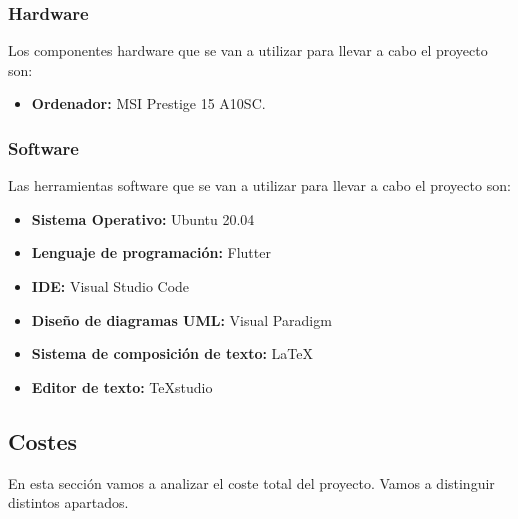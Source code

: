 \begin{adjustwidth}{2em}{0pt} %
\subsubsection{Hardware}

Los componentes hardware que se van a utilizar para llevar a cabo el proyecto son: 

\begin{itemize}
	\item \textbf{Ordenador:} MSI Prestige 15 A10SC.
\end{itemize}

\subsubsection{Software}

Las herramientas software que se van a utilizar para llevar a cabo el proyecto son: 

\begin{itemize}
	\item \textbf{Sistema Operativo:} Ubuntu 20.04
	\item \textbf{Lenguaje de programación:} Flutter
	\item \textbf{IDE:} Visual Studio Code
	\item \textbf{Diseño de diagramas UML:} Visual Paradigm
	\item \textbf{Sistema de composición de texto:} LaTeX
	\item \textbf{Editor de texto:} TeXstudio
\end{itemize}
\end{adjustwidth} 

\subsection{Costes}

En esta sección vamos a analizar el coste total del proyecto. Vamos a distinguir distintos apartados. 

